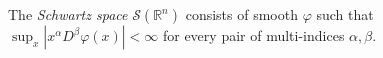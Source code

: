 
The \emph{Schwartz space} $\mathcal S(\mathbb R^n)$ consists of smooth $\varphi$ such that $\sup_x|x^\alpha D^\beta\varphi(x)|<\infty$ for every pair of multi-indices $\alpha,\beta$.
